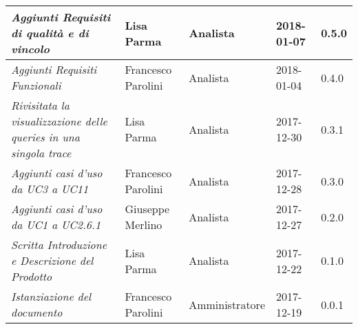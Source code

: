 \begin{longtable}{C{4cm}|C{3cm}|C{3cm}|C{2.5cm}|C{2cm}}
		\hline
		\emph{Aggiunti Requisiti di qualità e di vincolo}& Lisa Parma & Analista & 2018-01-07 & 0.5.0 \\
		\hline
		\emph{Aggiunti Requisiti Funzionali}& Francesco Parolini & Analista & 2018-01-04 & 0.4.0 \\
		\hline
		\emph{Rivisitata la visualizzazione delle queries in una singola trace}& Lisa Parma & Analista & 2017-12-30 & 0.3.1 \\
		\hline
		\emph{Aggiunti casi d'uso da UC3 a UC11}& Francesco Parolini & Analista & 2017-12-28 & 0.3.0 \\
		\hline
		\emph{Aggiunti casi d'uso da UC1 a UC2.6.1}& Giuseppe Merlino & Analista & 2017-12-27 & 0.2.0 \\
		\hline
		\emph{Scritta Introduzione e Descrizione del Prodotto}& Lisa Parma & Analista & 2017-12-22 & 0.1.0 \\
		\hline
		\emph{Istanziazione del documento}& Francesco Parolini & Amministratore & 2017-12-19 & 0.0.1 \\
		\hline
\end{longtable}
\clearpage